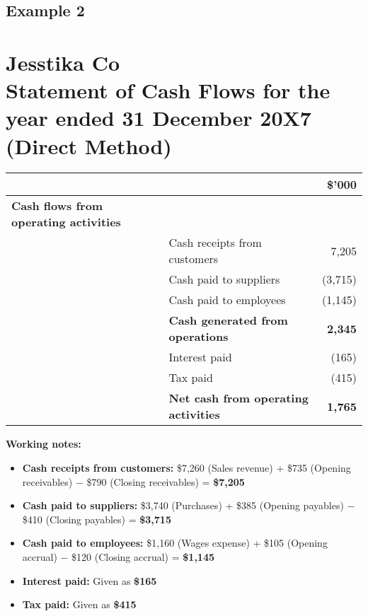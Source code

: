 \subsection{Example 2}
\section*{Jesstika Co\\Statement of Cash Flows for the year ended 31 December 20X7\\(Direct Method)}

\begin{tabular}{@{}llr@{}}
\toprule
\textbf{} & \textbf{} & \textbf{\$'000} \\
\midrule
\textbf{Cash flows from operating activities} & & \\
& Cash receipts from customers & 7,205 \\
& Cash paid to suppliers & (3,715) \\
& Cash paid to employees & (1,145) \\
& \textbf{Cash generated from operations} & \textbf{2,345} \\
& Interest paid & (165) \\
& Tax paid & (415) \\
& \textbf{Net cash from operating activities} & \textbf{1,765} \\
\bottomrule
\end{tabular}

\vspace{1cm}

\textbf{Working notes:}
\begin{itemize}
    \item \textbf{Cash receipts from customers:} \$7,260 (Sales revenue) + \$735 (Opening receivables) − \$790 (Closing receivables) = \textbf{\$7,205}
    \item \textbf{Cash paid to suppliers:} \$3,740 (Purchases) + \$385 (Opening payables) − \$410 (Closing payables) = \textbf{\$3,715}
    \item \textbf{Cash paid to employees:} \$1,160 (Wages expense) + \$105 (Opening accrual) − \$120 (Closing accrual) = \textbf{\$1,145}
    \item \textbf{Interest paid:} Given as \textbf{\$165}
    \item \textbf{Tax paid:} Given as \textbf{\$415}
\end{itemize}
